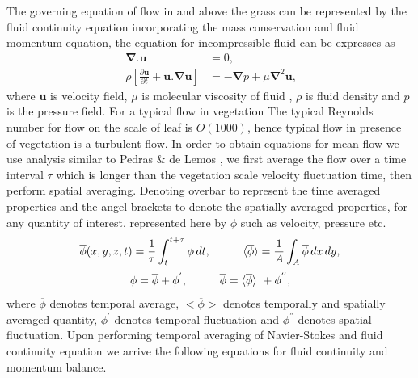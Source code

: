 \documentclass[12pt]{report}   %
\newcommand{\bu}{\mathbf{u}}
\newcommand{\grad}{\mathbf{\nabla}}
\renewcommand{\bar}{\overline}
\begin{document}
The governing equation of flow in and above the grass can be represented by the fluid continuity equation incorporating the mass conservation and fluid momentum equation, the equation for incompressible fluid can be expresses as
\begin{equation}\
\begin{split}
  \grad .{\bu}&=0, \\
 \rho \left[ \frac{\partial {\bu}  }{\partial t}+  {\bu} . \grad \bu  \right ] &= - \grad{p} +\mu \grad^2\bu ,
\end{split}
\label{NavierStokes}
\end{equation}
where $\bu$ is velocity field, $\mu$ is molecular viscosity of fluid , $\rho$ is fluid density and $p$ is the pressure field.
For a typical flow in vegetation The typical Reynolds number for flow on the scale of leaf is $O(1000)$, hence typical flow in presence of vegetation is a turbulent flow. In order to obtain equations for mean flow we use analysis similar to Pedras $\&$ de Lemos \cite{Pedras00}, we first average the flow over a time interval $\tau$ which is longer than the vegetation scale velocity fluctuation time, then perform spatial averaging. Denoting 
overbar to represent the time averaged properties and the angel brackets to denote the spatially averaged properties, for any quantity of interest, represented here by $\phi$ such as velocity, pressure etc.
  \[ \bar{\phi}(x,y,z,t) = \frac{1}{\tau} \int_{t}^{t+\tau} \phi  \, dt, \hspace{1.cm}  \langle \bar{\phi}\rangle = \frac{1}{A} \int_{A} \bar{\phi}  \,dx \,dy, \]
  \[\phi = \bar{\phi}+\phi^{'}, \hspace{1.cm}  \bar{\phi} = \langle \bar{\phi} \rangle \ +\phi^{''}, \]
 where $\bar{\phi}$ denotes temporal average, $<\bar{\phi}>$ denotes temporally and spatially averaged quantity, $\phi^{'}$ denotes temporal fluctuation and $\phi^{''}$ denotes spatial fluctuation. Upon performing temporal averaging of Navier-Stokes and fluid continuity equation we arrive the following equations for fluid continuity and momentum balance.
\end{document}
